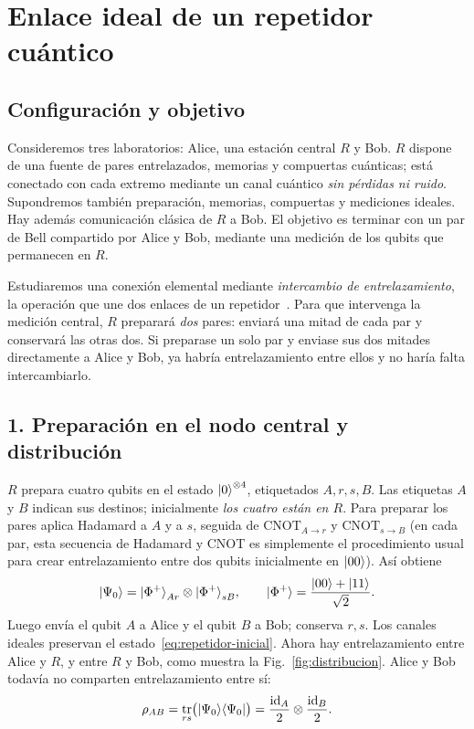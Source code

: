 \documentclass[letterpaper,12pt]{article}
\DeclareMathOperator{\tr}{tr}
\DeclareMathOperator{\id}{id}
\numberwithin{equation}{section}
\begin{document}
\section{Enlace ideal de un repetidor cuántico}

\subsection*{Configuración y objetivo}
Consideremos tres laboratorios: Alice, una estación central $R$ y Bob.
$R$ dispone de una fuente de pares entrelazados, memorias y compuertas
cuánticas; está conectado con cada extremo mediante un canal cuántico
\emph{sin pérdidas ni ruido}. Supondremos también preparación, memorias,
compuertas y mediciones ideales. Hay además comunicación clásica de $R$
a Bob. El objetivo es terminar con un par de Bell compartido por Alice y
Bob, mediante una medición de los qubits que permanecen en $R$.

Estudiaremos una conexión elemental mediante \emph{intercambio de
entrelazamiento}, la operación que une dos enlaces de un
repetidor~\cite{briegel1998repeaters,dur1999repeaters}.
Para que intervenga la medición central, $R$ preparará \emph{dos} pares:
enviará una mitad de cada par y conservará las otras dos. Si preparase un
solo par y enviase sus dos mitades directamente a Alice y Bob, ya habría
entrelazamiento entre ellos y no haría falta intercambiarlo.

\subsection*{1. Preparación en el nodo central y distribución}
$R$ prepara cuatro qubits en el estado ${\vert 0 \rangle}^{\otimes4}$, etiquetados
$A,r,s,B$. Las etiquetas $A$ y $B$ indican sus destinos; inicialmente
\emph{los cuatro están en $R$}. Para preparar los pares aplica Hadamard a
$A$ y a $s$, seguida de $\mathrm{CNOT}_{A\to r}$ y
$\mathrm{CNOT}_{s\to B}$ (en cada par, esta secuencia de Hadamard y CNOT
es simplemente el procedimiento usual para crear entrelazamiento entre
dos qubits inicialmente en ${\vert 00 \rangle}$). Así obtiene
\begin{equation}
  {\vert \Psi_0 \rangle}
  ={\vert \Phi^+ \rangle}_{Ar}\otimes{\vert \Phi^+ \rangle}_{sB},
  \qquad
  {\vert \Phi^+ \rangle}=\frac{{\vert 00 \rangle}+{\vert 11 \rangle}}{\sqrt2}.
  \label{eq:repetidor-inicial}
\end{equation}
Luego envía el qubit $A$ a Alice y el qubit $B$ a Bob; conserva $r,s$.
Los canales ideales preservan el estado~\eqref{eq:repetidor-inicial}.
Ahora hay entrelazamiento entre Alice y $R$, y entre $R$ y Bob, como muestra
la Fig.~\ref{fig:distribucion}. Alice y Bob todavía no comparten
entrelazamiento entre sí:
\[
  \rho_{AB}=\tr_{rs}\bigl(\proj{\Psi_0}{\Psi_0}\bigr)
  =\frac{\id_A}{2}\otimes\frac{\id_B}{2}.
\]
\end{document}
